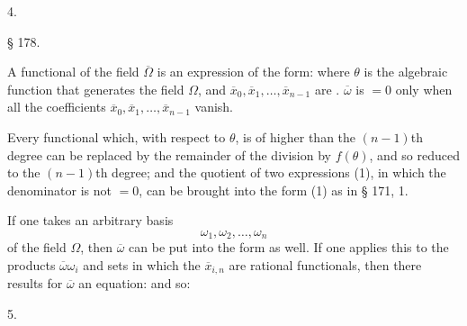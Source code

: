 
4. 


\begin{center}
§ 178.\\
\end{center}

A functional of the field $\overline{\Omega}$ is an expression of the form:
where $\theta$ is the algebraic function that generates the field $\Omega$, and $\overline{x}_0, \overline{x}_1, \ldots, \overline{x}_{n-1}$ are . $\overline{\omega}$ is $= 0$ only when all the coefficients $\overline{x}_0, \overline{x}_1, \ldots, \overline{x}_{n-1}$ vanish.

Every functional which, with respect to $\theta$, is of higher than the $(n-1)$th degree can be replaced by the remainder of the division by $f(\theta)$, and so reduced to the $(n-1)$th degree; and the quotient of two expressions (1), in which the denominator is not $=0$, can be brought into the form (1) as in § 171, 1.

If one takes an arbitrary basis
\[
\omega_1, \omega_2, \ldots, \omega_n
\]
of the field $\Omega$, then $\overline{\omega}$ can be put into the form
as well. If one applies this to the products $\overline{\omega}\omega_i$ and sets
in which the $\overline{x}_{i,n}$ are rational functionals, then there results for $\overline{\omega}$ an equation:
and so:

5. 
